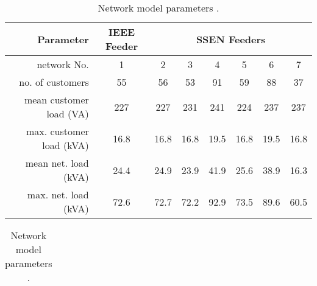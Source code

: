 \begin{table}\centering
\begin{tabular}{r | c | c c c c c c}
Parameter & IEEE Feeder & \multicolumn{6}{c}{SSEN Feeders}\\
\hline
network No. & 1 & 2 & 3 & 4 & 5 & 6 & 7\\
\hline
no. of customers & 55 & 56 & 53 & 91 & 59 & 88 & 37\\
mean customer load (VA) & 227 & 227 & 231 & 241 & 224 & 237 & 237\\
max. customer load (kVA)& 16.8 & 16.8 & 16.8 & 19.5 & 16.8 & 19.5 & 16.8\\
mean net. load (kVA)& 24.4 & 24.9 & 23.9 & 41.9 & 25.6 & 38.9 & 16.3\\
max. net. load (kVA)& 72.6 & 72.7 & 72.2 & 92.9 & 73.5 & 89.6 & 60.5\\ 
\end{tabular}
\caption{Network model parameters \cite{NTVV2016}.}
\label{ch4:tab:model-parameters}
\begin{tabular}{ccc}
\end{tabular}
\end{table}